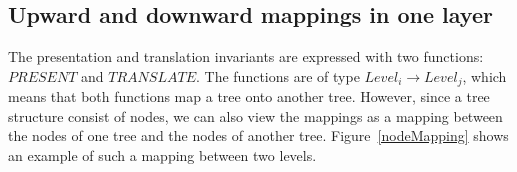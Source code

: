 







%										
%										
\subsection{Upward and downward mappings in one layer} \label{mappingsInLayer}

The presentation and translation invariants are expressed with two functions: $PRESENT$ and $TRANSLATE$. The functions are of type $Level_i \rightarrow Level_j$, which means that both functions map a tree onto another tree. However, since a tree structure consist of nodes, we can also view the mappings as a mapping between the nodes of one tree and the nodes of another tree.  Figure~\ref{nodeMapping} shows an example of such a mapping between two levels. 


